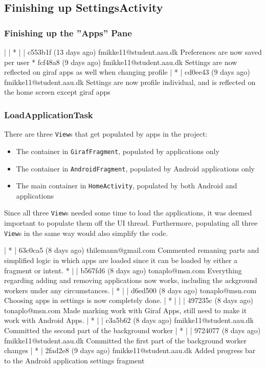 \subsection{Finishing up SettingsActivity}

\subsubsection{Finishing up the ''Apps'' Pane}
| | * | | c553b1f (13 days ago) fmikke11@student.aau.dk Preferences are now saved per user
* fcf48a8 (9 days ago) fmikke11@student.aau.dk Settings are now reflected on giraf apps as well when changing profile
| * | cd0ee43 (9 days ago) fmikke11@student.aau.dk Settings are now profile individual, and is reflected on the home screen except giraf apps

\subsubsection{LoadApplicationTask}\label{sec:sprint4:dev:loadapplicationtask}
There are three \lstinline!View!s that get populated by apps in the \launcher project:

\begin{itemize}
\item The container in \lstinline!GirafFragment!, populated by \giraf applications only
\item The container in \lstinline!AndroidFragment!, populated by Android applications only
\item The main container in \lstinline!HomeActivity!, populated by both Android and \giraf applications
\end{itemize}

Since all three \lstinline!View!s needed some time to load the applications, it was deemed important to populate them off the UI thread.
Furthermore, populating all three \lstinline!View!s in the same way would also simplify the code.

| * | 63c0ca5 (8 days ago) thilemann@gmail.com Commented remaning parts and simplified logic in which apps are loaded since it can be loaded by either a fragment or intent.
* | | b567fd6 (8 days ago) tonaplo@msn.com Everything regarding adding and removing applications now works, including the ackground workers under any circumstances.
| * | | d6ed500 (8 days ago) tonaplo@msn.com Choosing apps in settings is now completely done.
| * | | | 497235c (8 days ago) tonaplo@msn.com Made marking work with Giraf Apps, still need to make it work with Android Apps.
| * | | c3a5b62 (8 days ago) fmikke11@student.aau.dk Committed the second part of the background worker
| * | | 9724077 (8 days ago) fmikke11@student.aau.dk Committed the first part of the background worker changes
| * | 2fad2e8 (9 days ago) fmikke11@student.aau.dk Added progress bar to the Android application settings fragment

